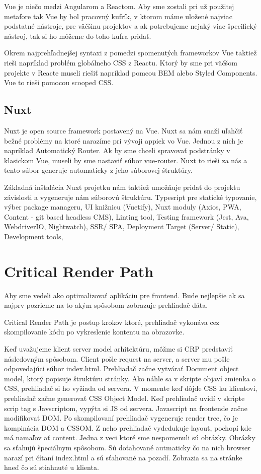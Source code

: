 Vue je niečo medzi Angularom a Reactom. Aby sme zostali pri už použitej metafore tak Vue by bol pracovný kufrík, v ktorom máme uložené najviac podstatné nástroje, pre väčšinu projektov a ak potrebujeme nejaký viac špecifický nástroj, tak si ho môžeme do toho kufra pridať.

Okrem najprehľadnejšej syntaxi z pomedzi spomenutých frameworkov Vue taktiež rieši napríklad problém globálneho CSS z Reactu. Ktorý by sme pri väčšom projekte v Reacte museli riešiť napríklad pomcou BEM alebo Styled Components. Vue to rieši pomocou scooped CSS.

\subsection{Nuxt}
Nuxt je open source framework postavený na Vue. Nuxt sa nám snaží uľahčiť bežné problémy na ktoré narazíme pri vývoji appiek vo Vue. Jednou z nich je napríklad Automatický Router. Ak by sme chceli spravovať podstránky v klasickom Vue, museli by sme nastaviť súbor vue-router. Nuxt to rieši za nás a tento súbor generuje automaticky z jeho súborovej štruktúry. 

Základná inštalácia Nuxt projetku nám taktiež umožňuje pridať do projektu závislosti a vygeneruje nám súborovú štruktúru. Typesript pre statické typovanie, výber package manageru, UI knižnicu (Vuetify), Nuxt moduly (Axios, PWA, Content - git based headless CMS), Linting tool, Testing framework (Jest, Ava, WebdriverIO, Nightwatch), SSR/ SPA, Deployment Target (Server/ Static), Development tools,

\section{Critical Render Path}
Aby sme vedeli ako optimalizovať aplikáciu pre frontend. Bude nejlepšie ak sa najprv pozrieme na to akým spôsobom zobrazuje prehliadač dáta.

Critical Render Path je postup krokov ktoré, prehliadač vykonáva cez skompilovanie kódu po vykreslenie kontentu na obrazovke. 

Keď uvažujeme klient server model arhitektúru, môžme si CRP predstaviť následovným spôsobom. Client pošle request na server, a server mu pošle odpovedajúci súbor index.html. Prehliadač začne vytvárať Document object model, ktorý popisuje štruktúru stránky. Ako náhle sa v skripte objaví zmienka o CSS, prehliadač si ho vyžiada od servera. V momente keď dôjde CSS ku klientovi, prehliadač začne generovať CSS Object Model. Keď prehliadač uvidí v skripte scrip tag s Javscriptom, vypýta si JS od servera. Javascript na frontende začne modifikovať DOM. Po skompilovaní prehliadač vygeneruje render tree, čo je kompinácia DOM a CSSOM. Z neho prehliadač vydedukuje layout, pochopí kde má namaľov  ať content. Jedna z veci ktoré sme nespomenuli sú obrázky. Obrázky sa sťahujú špeciálnym spôsobom. Sú doťahované autmaticky čo na nich browser narazí pri čítaní index.html a sú sťahované na pozadí. Zobrazia sa na stránke hneď čo sú stiahnuté u klienta.